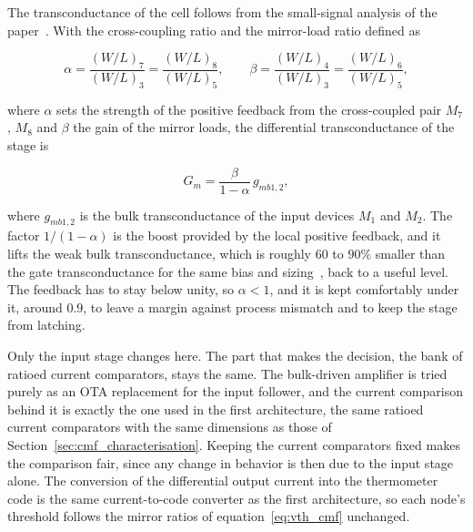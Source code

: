 The transconductance of the cell follows from the small-signal analysis of the paper~\cite{ballo2022}. With the cross-coupling ratio and the mirror-load ratio defined as

\begin{equation}
    \alpha = \frac{(W/L)_7}{(W/L)_3} = \frac{(W/L)_8}{(W/L)_5}, \qquad
    \beta  = \frac{(W/L)_4}{(W/L)_3} = \frac{(W/L)_6}{(W/L)_5},
    \label{eq:bulk_alpha_beta}
\end{equation}

\noindent
where $\alpha$ sets the strength of the positive feedback from the cross-coupled pair $M_7$, $M_8$ and $\beta$ the gain of the mirror loads, the differential transconductance of the stage is

\begin{equation}
    G_m = \frac{\beta}{1-\alpha}\, g_{mb1,2},
    \label{eq:bulk_gm}
\end{equation}

\noindent
where $g_{mb1,2}$ is the bulk transconductance of the input devices $M_1$ and $M_2$. The factor $1/(1-\alpha)$ is the boost provided by the local positive feedback, and it lifts the weak bulk transconductance, which is roughly $60$ to $90\%$ smaller than the gate transconductance for the same bias and sizing~\cite{ballo2022}, back to a useful level. The feedback has to stay below unity, so $\alpha < 1$, and it is kept comfortably under it, around $0.9$, to leave a margin against process mismatch and to keep the stage from latching.

Only the input stage changes here. The part that makes the decision, the bank of ratioed current comparators, stays the same. The bulk-driven amplifier is tried purely as an OTA replacement for the input follower, and the current comparison behind it is exactly the one used in the first architecture, the same ratioed current comparators with the same dimensions as those of Section~\ref{sec:cmf_characterisation}. Keeping the current comparators fixed makes the comparison fair, since any change in behavior is then due to the input stage alone. The conversion of the differential output current into the thermometer code is the same current-to-code converter as the first architecture, so each node's threshold follows the mirror ratios of equation~\eqref{eq:vth_cmf} unchanged.
\paragraph{}
\paragraph{}
